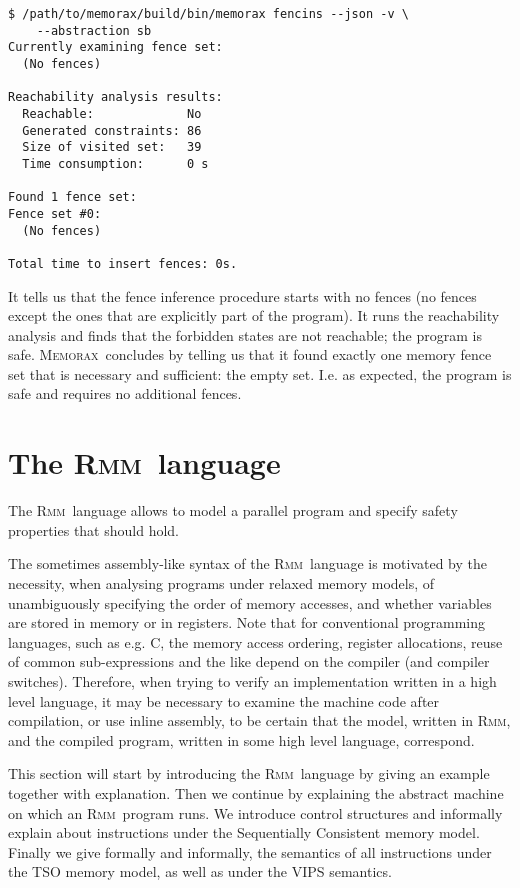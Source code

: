 \documentclass[a4paper]{article}
\newcommand{\memorax}{\textsc{Memorax}}
\newcommand{\rmm}{\textsc{Rmm}}
\begin{document}
\noindent
\begin{verbatim}
$ /path/to/memorax/build/bin/memorax fencins --json -v \
    --abstraction sb
Currently examining fence set:
  (No fences)

Reachability analysis results:
  Reachable:             No
  Generated constraints: 86
  Size of visited set:   39
  Time consumption:      0 s

Found 1 fence set:
Fence set #0:
  (No fences)

Total time to insert fences: 0s.
\end{verbatim}

It tells us that the fence inference procedure starts with no fences
(no fences except the ones that are explicitly part of the
program). It runs the reachability analysis and finds that the
forbidden states are not reachable; the program is safe. \memorax\
concludes by telling us that it found exactly one memory fence set
that is necessary and sufficient: the empty set. I.e. as expected, the
program is safe and requires no additional fences.

\section{The \rmm\ language}\label{sec:rmm:language}

The \rmm\ language allows to model a parallel program and specify safety
properties that should hold.

The sometimes assembly-like syntax of the \rmm\ language is motivated by
the necessity, when analysing programs under relaxed memory models, of
unambiguously specifying the order of memory accesses, and whether
variables are stored in memory or in registers. Note that for
conventional programming languages, such as e.g. C, the memory access
ordering, register allocations, reuse of common sub-expressions and the
like depend on the compiler (and compiler switches). Therefore, when
trying to verify an implementation written in a high level language,
it may be necessary to examine the machine code after compilation, or
use inline assembly, to be certain that the model, written in \rmm, and
the compiled program, written in some high level language, correspond.

This section will start by introducing the \rmm\ language by giving an
example together with explanation. Then we continue by explaining the
abstract machine on which an \rmm\ program runs. We introduce control
structures and informally explain about instructions under the
Sequentially Consistent memory model. Finally we give formally and
informally, the semantics of all instructions under the TSO memory
model, as well as under the VIPS semantics.
\end{document}
